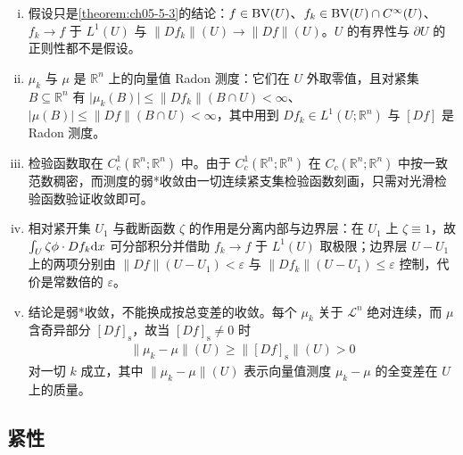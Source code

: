 \documentclass[../../main.tex]{subfiles}%
\begin{document}
\begin{remark}\label{remark:ch05-thm-5-4-条件}
\begin{enumerate}[(i)]
\item 假设只是\cref{theorem:ch05-5-3}的结论：$f\in\mathrm{BV}(U)$、$f_k\in\mathrm{BV}(U)\cap C^{\infty}(U)$、$f_k\to f$ 于 $L^1(U)$ 与 $\lVert Df_k\rVert(U)\to\lVert Df\rVert(U)$。$U$ 的有界性与 $\partial U$ 的正则性都不是假设。%
\item $\mu_k$ 与 $\mu$ 是 $\mathbb{R}^n$ 上的向量值 Radon 测度：它们在 $U$ 外取零值，且对紧集 $B\subseteq\mathbb{R}^n$ 有 $\lvert\mu_k(B)\rvert\leqslant\lVert Df_k\rVert(B\cap U)<\infty$、$\lvert\mu(B)\rvert\leqslant\lVert Df\rVert(B\cap U)<\infty$，其中用到 $Df_k\in L^1(U;\mathbb{R}^n)$ 与 $[Df]$ 是 Radon 测度。
\item 检验函数取在 $C_c^1(\mathbb{R}^n;\mathbb{R}^n)$ 中。由于 $C_c^1(\mathbb{R}^n;\mathbb{R}^n)$ 在 $C_c(\mathbb{R}^n;\mathbb{R}^n)$ 中按一致范数稠密，而测度的弱*收敛由一切连续紧支集检验函数刻画，只需对光滑检验函数验证收敛即可。
\item 相对紧开集 $U_1$ 与截断函数 $\zeta$ 的作用是分离内部与边界层：在 $U_1$ 上 $\zeta\equiv1$，故 $\int_U\zeta\phi\cdot Df_k\mathrm{d} x$ 可分部积分并借助 $f_k\to f$ 于 $L^1(U)$ 取极限；边界层 $U-U_1$ 上的两项分别由 $\lVert Df\rVert(U-U_1)<\varepsilon$ 与 $\lVert Df_k\rVert(U-U_1)\leqslant\varepsilon$ 控制，代价是常数倍的 $\varepsilon$。
\item 结论是弱*收敛，不能换成按总变差的收敛。每个 $\mu_k$ 关于 $\mathcal{L}^n$ 绝对连续，而 $\mu$ 含奇异部分 $[Df]_{\mathrm{s}}$，故当 $[Df]_{\mathrm{s}}\neq0$ 时
\begin{align*}
\lVert\mu_k-\mu\rVert(U)\geqslant\bigl\lVert[Df]_{\mathrm{s}}\bigr\rVert(U)>0
\end{align*}
对一切 $k$ 成立，其中 $\lVert\mu_k-\mu\rVert(U)$ 表示向量值测度 $\mu_k-\mu$ 的全变差在 $U$ 上的质量。
\end{enumerate}
\end{remark}

\subsection{紧性}\label{subsection:ch05-02-3}
\end{document}
